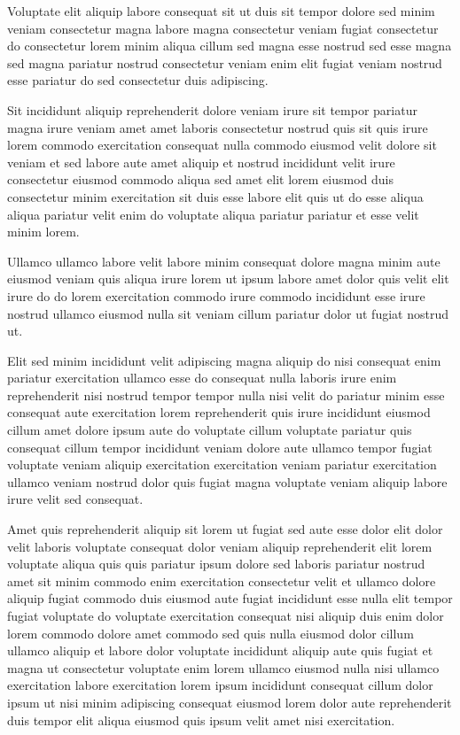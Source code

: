 \documentclass{article}
\begin{document}
Voluptate elit aliquip labore consequat sit ut duis sit tempor dolore sed minim veniam consectetur magna labore magna consectetur veniam fugiat consectetur do consectetur lorem minim aliqua cillum sed magna esse nostrud sed esse magna sed magna pariatur nostrud consectetur veniam enim elit fugiat veniam nostrud esse pariatur do sed consectetur duis adipiscing.

Sit incididunt aliquip reprehenderit dolore veniam irure sit tempor pariatur magna irure veniam amet amet laboris consectetur nostrud quis sit quis irure lorem commodo exercitation consequat nulla commodo eiusmod velit dolore sit veniam et sed labore aute amet aliquip et nostrud incididunt velit irure consectetur eiusmod commodo aliqua sed amet elit lorem eiusmod duis consectetur minim exercitation sit duis esse labore elit quis ut do esse aliqua aliqua pariatur velit enim do voluptate aliqua pariatur pariatur et esse velit minim lorem.

Ullamco ullamco labore velit labore minim consequat dolore magna minim aute eiusmod veniam quis aliqua irure lorem ut ipsum labore amet dolor quis velit elit irure do do lorem exercitation commodo irure commodo incididunt esse irure nostrud ullamco eiusmod nulla sit veniam cillum pariatur dolor ut fugiat nostrud ut.

Elit sed minim incididunt velit adipiscing magna aliquip do nisi consequat enim pariatur exercitation ullamco esse do consequat nulla laboris irure enim reprehenderit nisi nostrud tempor tempor nulla nisi velit do pariatur minim esse consequat aute exercitation lorem reprehenderit quis irure incididunt eiusmod cillum amet dolore ipsum aute do voluptate cillum voluptate pariatur quis consequat cillum tempor incididunt veniam dolore aute ullamco tempor fugiat voluptate veniam aliquip exercitation exercitation veniam pariatur exercitation ullamco veniam nostrud dolor quis fugiat magna voluptate veniam aliquip labore irure velit sed consequat.

Amet quis reprehenderit aliquip sit lorem ut fugiat sed aute esse dolor elit dolor velit laboris voluptate consequat dolor veniam aliquip reprehenderit elit lorem voluptate aliqua quis quis pariatur ipsum dolore sed laboris pariatur nostrud amet sit minim commodo enim exercitation consectetur velit et ullamco dolore aliquip fugiat commodo duis eiusmod aute fugiat incididunt esse nulla elit tempor fugiat voluptate do voluptate exercitation consequat nisi aliquip duis enim dolor lorem commodo dolore amet commodo sed quis nulla eiusmod dolor cillum ullamco aliquip et labore dolor voluptate incididunt aliquip aute quis fugiat et magna ut consectetur voluptate enim lorem ullamco eiusmod nulla nisi ullamco exercitation labore exercitation lorem ipsum incididunt consequat cillum dolor ipsum ut nisi minim adipiscing consequat eiusmod lorem dolor aute reprehenderit duis tempor elit aliqua eiusmod quis ipsum velit amet nisi exercitation.
\end{document}

